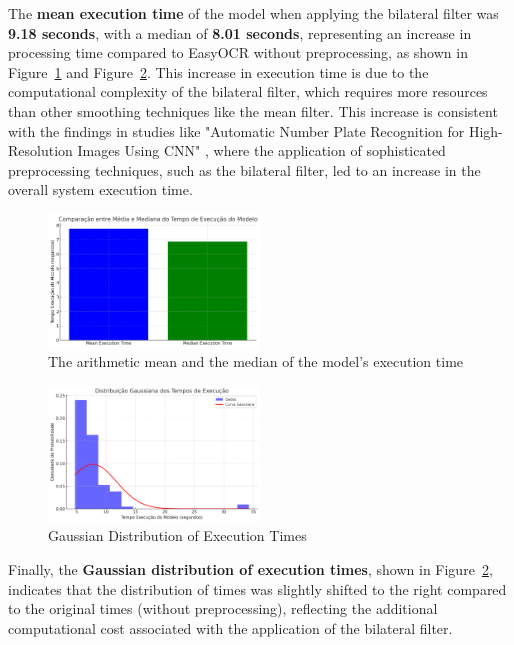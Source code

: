 \documentclass[conference]{IEEEtran}
\begin{document}
	The \textbf{mean execution time} of the model when applying the bilateral filter was \textbf{9.18 seconds}, with a median of \textbf{8.01 seconds}, representing an increase in processing time compared to EasyOCR without preprocessing, as shown in Figure~\ref{img14} and Figure~\ref{img15}. This increase in execution time is due to the computational complexity of the bilateral filter, which requires more resources than other smoothing techniques like the mean filter. This increase is consistent with the findings in studies like "Automatic Number Plate Recognition for High-Resolution Images Using CNN" \cite{b15}, where the application of sophisticated preprocessing techniques, such as the bilateral filter, led to an increase in the overall system execution time.
	
	\begin{figure}[htbp]
		\centerline{\includegraphics[width=0.5\textwidth]{img14.png}}
		\caption{The arithmetic mean and the median of the model's execution time}
		\label{img14}
	\end{figure}
	
	\begin{figure}[htbp]
		\centerline{\includegraphics[width=0.5\textwidth]{img15.png}}
		\caption{Gaussian Distribution of Execution Times}
		\label{img15}
	\end{figure}
	
	Finally, the \textbf{Gaussian distribution of execution times}, shown in Figure~\ref{img15}, indicates that the distribution of times was slightly shifted to the right compared to the original times (without preprocessing), reflecting the additional computational cost associated with the application of the bilateral filter.
	
\end{document}

